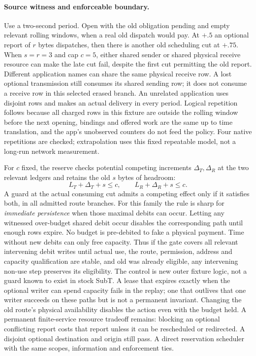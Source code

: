 \documentclass{article}
\begin{document}
\paragraph{Source witness and enforceable boundary.}
Use a two-second period. Open with the old obligation pending and
empty relevant rolling windows, when a real old dispatch would pay.
At \(+.5\) an optional report of \(r\) bytes dispatches, then there is
another old scheduling cut at \(+.75\). When \(s=r=3\) and cap \(c=5\),
either shared sender or shared physical receive resource can make
the late cut fail, despite the first cut permitting the old report.
Different application names can share the same physical receive row.
A lost optional transmission still consumes its shared sending row;
it does not consume a receive row in this selected erased branch.
An unrelated application uses disjoint rows and makes an actual
delivery in every period. Logical repetition follows because all
charged rows in this fixture are outside the rolling window before
the next opening, bindings and offered work are the same up to time
translation, and the app's unobserved counters do not feed the policy.
Four native repetitions are checked; extrapolation uses this fixed
repeatable model, not a long-run network measurement.

For \(c\) fixed, the reserve checks potential competing
increments \(\Delta_T,\Delta_R\) at the two relevant ledgers and
retains the old \(s\) bytes of headroom:
\[
  L_T+\Delta_T+s\le c,\qquad L_R+\Delta_R+s\le c.
\]
A guard at the actual consuming cut admits a competing effect only
if it satisfies both, in all admitted route branches. For this
family the rule is sharp for \emph{immediate persistence} when those
maximal debits can occur. Letting any witnessed over-budget shared
debit occur disables the corresponding path until enough rows expire.
No budget is pre-debited to fake a physical payment. Time without
new debits can only free capacity. Thus if the gate covers all relevant
intervening debit writes until actual use, the route, permission,
address and capacity qualification are stable, and old was already
eligible, any intervening non-use step preserves its eligibility.
The control is new outer fixture logic, not a guard known to exist
in stock SubT. A lease that expires exactly when the optional writer
can spend capacity fails in the replay; one that outlives that one
writer succeeds on these paths but is not a permanent invariant.
Changing the old route's physical availability disables the action
even with the budget held. A permanent finite-service resource
tradeoff remains: blocking an optional conflicting report costs
that report unless it can be rescheduled or redirected. A disjoint
optional destination and origin still pass. A direct reservation
scheduler with the same scopes, information and enforcement ties.
\end{document}
